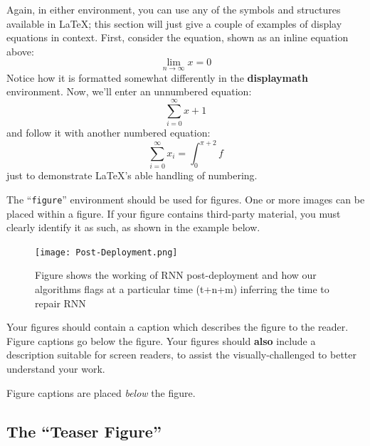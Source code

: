\documentclass[sigconf,authordraft]{acmart}
\begin{document}
Again, in either environment, you can use any of the symbols and
structures available in \LaTeX\@; this section will just give a couple
of examples of display equations in context.  First, consider the
equation, shown as an inline equation above:
\begin{equation}
  \lim_{n\rightarrow \infty}x=0
\end{equation}
Notice how it is formatted somewhat differently in
the \textbf{displaymath}
environment.  Now, we'll enter an unnumbered equation:
\begin{displaymath}
  \sum_{i=0}^{\infty} x + 1
\end{displaymath}
and follow it with another numbered equation:
\begin{equation}
  \sum_{i=0}^{\infty}x_i=\int_{0}^{\pi+2} f
\end{equation}
just to demonstrate \LaTeX's able handling of numbering.


The ``\verb|figure|'' environment should be used for figures. One or
more images can be placed within a figure. If your figure contains
third-party material, you must clearly identify it as such, as shown
in the example below.


\begin{figure}
\texttt{[image: Post-Deployment.png]}
\caption{Figure shows the working of RNN post-deployment and how our algorithms flags at a particular time (t+n+m) inferring the time to repair RNN} \label{fig:4}
\end{figure}
Your figures should contain a caption which describes the figure to
the reader. Figure captions go below the figure. Your figures should
{\bfseries also} include a description suitable for screen readers, to
assist the visually-challenged to better understand your work.

Figure captions are placed {\itshape below} the figure.

\subsection{The ``Teaser Figure''}
\end{document}
